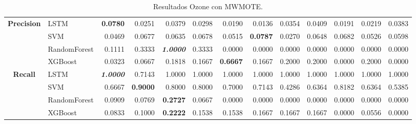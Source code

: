 \begin{table}[H]
\begin{adjustbox}{max width=12cm}
\begin{tabular}{|c|l|r|r|r|r|r|r|r|r|r|r|r|}
			\hline
			\textbf{Precision} &  LSTM & \textbf{  0.0780 } &  0.0251 &  0.0379 &  0.0298 &  0.0190 &  0.0136 &  0.0354 &  0.0409 &  0.0191 &  0.0219 &  0.0383 \\
			&  SVM &  0.0469 &  0.0677 &  0.0635 &  0.0678 &  0.0515 & \textbf{  0.0787 } &  0.0270 &  0.0648 &  0.0682 &  0.0526 &  0.0598 \\
			&  RandomForest &  0.1111 &  0.3333 & \textit{ \textbf{  1.0000 } } &  0.3333 &  0.0000 &  0.0000 &  0.0000 &  0.0000 &  0.0000 &  0.0000 &  0.0000 \\
			&  XGBoost &  0.0323 &  0.0667 &  0.1818 &  0.1667 & \textbf{  0.6667 } &  0.1667 &  0.2000 &  0.2000 &  0.0000 &  0.2000 &  0.0000 \\
			\hline
			\textbf{Recall} &  LSTM & \textit{ \textbf{  1.0000 } } &  0.7143 &  1.0000 &  1.0000 &  1.0000 &  1.0000 &  1.0000 &  1.0000 &  1.0000 &  1.0000 &  1.0000 \\
			&  SVM &  0.6667 & \textbf{  0.9000 } &  0.8000 &  0.8000 &  0.7000 &  0.7143 &  0.4286 &  0.6364 &  0.8182 &  0.6364 &  0.5385 \\
			&  RandomForest &  0.0909 &  0.0769 & \textbf{  0.2727 } &  0.0667 &  0.0000 &  0.0000 &  0.0000 &  0.0000 &  0.0000 &  0.0000 &  0.0000 \\
			&  XGBoost &  0.0833 &  0.1000 & \textbf{  0.2222 } &  0.1538 &  0.1538 &  0.1667 &  0.1667 &  0.1667 &  0.0000 &  0.0556 &  0.0000 \\
			\hline
		\end{tabular}
	\end{adjustbox}
	\caption{Resultados Ozone con MWMOTE.}
	\label{tab:Ozone_MWMOTE}
\end{table}

